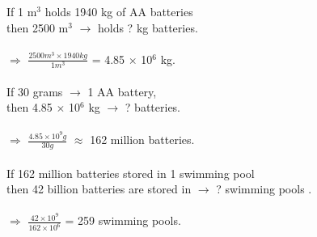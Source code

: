 \documentclass[11pt]{exam}
\begin{document}
\begin{questions}
{\begin{minipage}{42em}
                    If 1 m$^{3}$ holds 1940 kg of AA batteries \\ 
                    then 2500 m$^{3}$ $\rightarrow$ holds ? kg batteries. \\ \\
                    $\Rightarrow$ $\frac{2500 m^{3}\times 1940 kg}{1 m^{3}}$ = 4.85 $\times$ 10$^{6}$ kg. \\ \\
                    If 30 grams $\rightarrow$ 1 AA battery, \\
                    then 4.85 $\times$ 10$^{6}$ kg $\rightarrow$ ? batteries. \\ \\
                     $\Rightarrow$ $\frac{4.85\times 10^{9} g}{30 g}$ $\approx$ 162 million batteries. \\ \\ 
                    If 162 million batteries stored in 1 swimming pool \\
                    then 42 billion batteries are stored in $\rightarrow$ ? swimming pools . \\ \\
                    $\Rightarrow$ $\frac{42 \times 10^{9}}{162 \times 10^{6}}$ = 259 swimming  pools. \\ \\
\end{minipage}} \\ \\                    


\end{questions}
\end{document}
